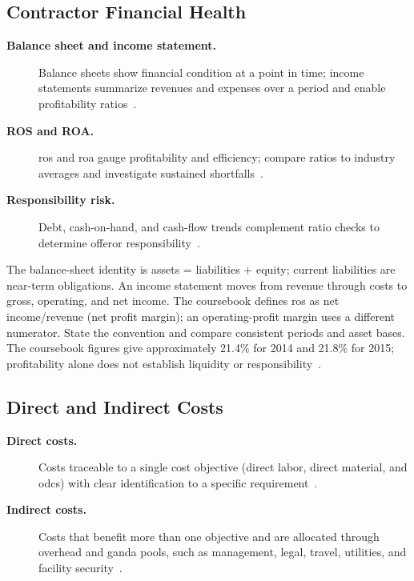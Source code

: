 \documentclass[../main.tex]{subfiles}
\begin{document}
\subsection{Contractor Financial Health}
\begin{description}
  \item[\textbf{Balance sheet and income statement.}] Balance sheets show financial condition at a point in time; income statements summarize revenues and expenses over a period and enable profitability ratios~\autocite{edo-3-2-4-cost-price-evaluation-2025}.
  \item[\textbf{ROS and ROA.}] \ac{ros} and \ac{roa} gauge profitability and efficiency; compare ratios to industry averages and investigate sustained shortfalls~\autocite{edo-3-2-4-cost-price-evaluation-2025}.
  \item[\textbf{Responsibility risk.}] Debt, cash-on-hand, and cash-flow trends complement ratio checks to determine offeror responsibility~\autocite{edo-3-2-4-cost-price-evaluation-2025}.
\end{description}

The balance-sheet identity is assets = liabilities + equity; current liabilities are near-term obligations. An income statement moves from revenue through costs to gross, operating, and net income. The coursebook defines \ac{ros} as net income/revenue (net profit margin); an operating-profit margin uses a different numerator. State the convention and compare consistent periods and asset bases. The coursebook figures give approximately 21.4\% for 2014 and 21.8\% for 2015; profitability alone does not establish liquidity or responsibility~\autocite{edo-3-2-4-cost-price-evaluation-2025}.

\subsection{Direct and Indirect Costs}
\begin{description}
  \item[\textbf{Direct costs.}] Costs traceable to a single cost objective (direct labor, direct material, and \acp{odc}) with clear identification to a specific requirement~\autocite{edo-3-2-4-cost-price-evaluation-2025,FAR-31-202-Direct-Costs}.
  \item[\textbf{Indirect costs.}] Costs that benefit more than one objective and are allocated through overhead and \ac{ganda} pools, such as management, legal, travel, utilities, and facility security~\autocite{edo-3-2-4-cost-price-evaluation-2025,FAR-31-203-Indirect-Costs}.
\end{description}
\end{document}
